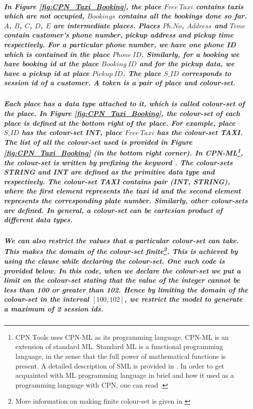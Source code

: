 \subparagraph*{\textnormal{In Figure \ref{fig:CPN_Taxi_Booking}, the place $\mathit{Free\ Taxi}$ contains taxis which are not occupied, $\mathit{Bookings}$ contains all the bookings done so far. $\mathit{A}$, $\mathit{B}$, $\mathit{C}$, $\mathit{D}$, $\mathit{E}$ are intermediate places. Places $\mathit{Ph. No}$, $\mathit{Address}$ and $\mathit{Time}$ contain customer's phone number, pickup address and pickup time respectively. For a particular phone number, we have one phone ID which is contained in the place $\mathit{Phone\ ID}$. Similarly, for a booking we have booking id at the place $\mathit{Booking\ ID}$ and for the pickup data, we have a pickup id at place $\mathit{Pickup\ ID}$. The place $\mathit{S\_ID}$ corresponds to session id of a customer. A token is a pair of place and colour-set.}}

\subparagraph*{\textnormal{Each place has a data type attached to it, which is called \textbf{colour-set} of the place. In Figure \ref{fig:CPN_Taxi_Booking}, the colour-set of each place is defined at the bottom right of the place. For example, place $\mathit{S\_ID}$ has the colour-set INT, place $\mathit{Free\ Taxi}$ has the colour-set TAXI. The list of all the colour-set used is provided in Figure \ref{fig:CPN_Taxi_Booking} (in the bottom right corner). In CPN-ML\footnote{CPN Tools uses CPN-ML as its programming language. CPN-ML is an extension of standard ML. Standard ML is a functional programming language, in the sense that the full power of mathematical functions is present. A detailed description of SML is provided in \cite{milner1997definition}. In order to get acquainted with ML programming language in brief and how it used as a programming language with CPN, one can read \cite{Jensen_CPN_Book_ML}.}, the colour-set is written by prefixing the keyword . The colour-sets STRING and INT are defined as the primitive data type  and  respectively. The colour-set TAXI contains pair (INT, STRING), where the first element represents the taxi id and the second element represents the corresponding plate number.  Similarly, other colour-sets are defined. In general, a colour-set can be cartesian product of different data types.}}

\subparagraph*{\textnormal{We can also restrict the values that a particular colour-set can take. This makes the domain of the colour-set finite\footnote{More information on making finite colour-set is given in \cite{CPN_Tools_ColourSet}}. This is achieved by using the  clause while declaring the colour-set. One such code is provided below. In this code, when we declare the colour-set  we put a limit on the colour-set stating that the value of the integer cannot be less than 100 or greater than 102. Hence by limiting the domain of the colour-set  in the interval $\mathit{\left[100,102\right]}$, we restrict the model to generate a maximum of 2 session ids.}}

